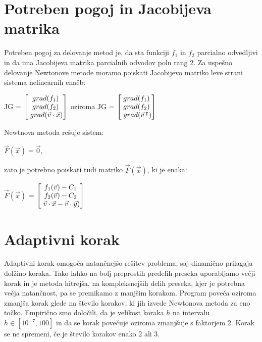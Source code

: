 \documentclass[12pt]{article}
\begin{document}
	\newpage	
	\section{Potreben pogoj in Jacobijeva matrika}
	Potreben pogoj za delovanje metod je, da sta funkciji $f_{1}$ in $f_{2}$ parcialno odvedljivi in da ima Jacobijeva matrika parcialnih odvodov poln rang 2. Za uspešno delovanje Newtonove metode moramo poiskati Jacobijevo matriko leve strani sistema nelinearnih enačb:
	
	\begin{center}
		JG = $\begin{bmatrix}
		grad(f_{1}) \\
		grad(f_{2}) \\
		\hspace{1mm}grad(\vec{v} \cdot \vec{x}) \\
		\end{bmatrix}$
		oziroma
		JG = $\begin{bmatrix}
		grad(f_{1}) \\
		grad(f_{2}) \\
		\hspace{1mm}grad(\vec{v}\hspace{0.5mm}^\intercal) \\
		\end{bmatrix}$
	\end{center}
	Newtnova metoda rešuje sistem:
	\begin{center}
		$\vec{F}(\vec{x}) = \vec{0}$,
	\end{center}
	zato je potrebno poiskati tudi matriko $\vec{F}(\vec{x})$, ki je enaka:
	\begin{center}
		$\vec{F}(\vec{x})$ = $\begin{bmatrix}
		f_{1}(\vec{v}) - C_{1} \\
		f_{2}(\vec{v}) - C_{2} \\
		\hspace{1mm}\vec{v} \cdot \vec{x} - \vec{v} \cdot \vec{y}) \\
		\end{bmatrix}$
	\end{center}
	
	\section{Adaptivni korak}
	Adaptivni korak omogoča natančnejšo rešitev problema, saj dinamično prilagaja dolžino koraka. Tako lahko na bolj preprostih predelih preseka uporabljamo večji korak in je metoda hitrejša, na kompleksnejših delih preseka, kjer je potrebna večja natančnost, pa se premikamo z manjšim korakom. Program poveča oziroma zmanjša korak glede na število korakov, ki jih izvede Newtonova metoda za eno točko. Empirično smo določili, da je velikost koraka $h$ na intervalu $h\in[10^{-7},100]$ in da se korak povečuje oziroma zmanjšuje s faktorjem 2. Korak se ne spremeni, če je število korakov enako 2 ali 3.
	
\end{document}
